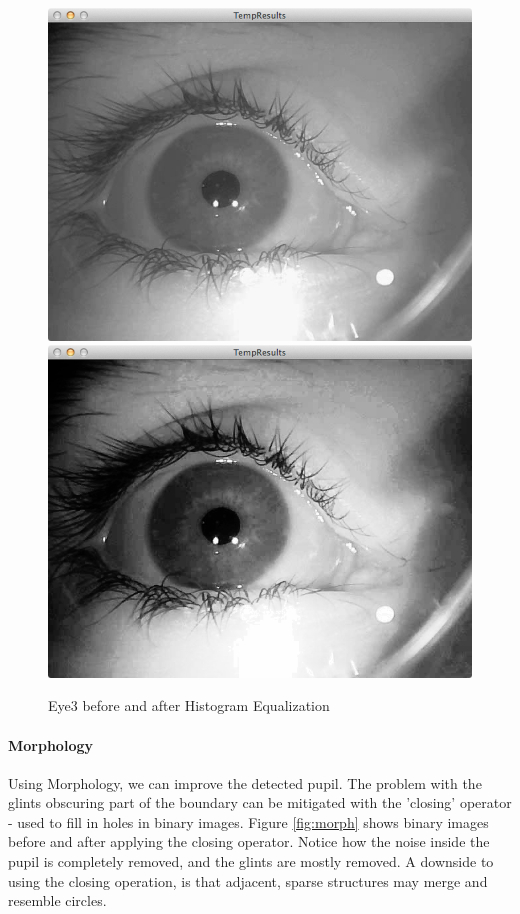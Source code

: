 \documentclass[a4paper,11pt]{article}
\begin{document}
\begin{figure}[ht]
  \centering
  \includegraphics[scale=0.2]{eye3}
  \includegraphics[scale=0.2]{eye3_hist_eq}
  \caption{Eye3 before and after Histogram Equalization}
  \label{fig:eye3_hist_eq}
\end{figure}

\paragraph{Morphology}
Using Morphology, we can improve the detected pupil. The problem with the glints obscuring part of the boundary can be mitigated with the 'closing' operator - used to fill in holes in binary images. Figure \ref{fig:morph} shows binary images before and after applying the closing operator. Notice how the noise inside the pupil is completely removed, and the glints are mostly removed.
A downside to using the closing operation, is that adjacent, sparse structures may merge and resemble circles.
\end{document}
